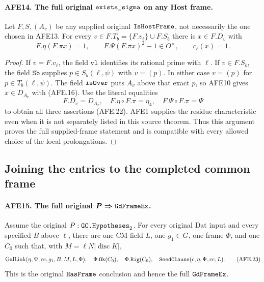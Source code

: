 \documentclass[11pt,a4paper]{article}
\numberwithin{equation}{section}
\theoremstyle{remark}\newtheorem{remark}[theorem]{Remark}
\begin{document}
\paragraph{AFE14. The full original \(\texttt{exists\_\allowbreak sigma}\) on any Host frame.}
\label{claim:AFE14}
Let \(F,S,(A_v)\) be any supplied original
\(\texttt{Is\allowbreak Host\allowbreak Frame}\), not necessarily the one
chosen in AFE13.
For every \(v\in F.T_b=\{F.v_\ell\}\cup F.S_b\)
there is \(x\in F.D_v\) with
\[
          F.\eta(F.\pi x)=1,\qquad
          F.\Psi(F.\pi x)^2-1\in O^\times,\qquad
                              c_\ell(x)=1.              \tag{AFE.22}
\]

\begin{proof}
If \(v=F.v_\ell\), the field \(\texttt{vl}\)
identifies its rational prime with \(\ell\).
If \(v\in F.S_b\), the field \(\texttt{Sb}\)
supplies \(p\in S_b(\ell,\psi)\) with \(v=(p)\).
In either case \(v=(p)\) for \(p\in T_b(\ell,\psi)\).
The field \(\texttt{is\allowbreak Over}\) puts \(A_v\) above
that exact \(p\), so AFE10 gives \(x\in D_{A_v}\)
with (AFE.16).
Use the literal equalities
\[
        F.D_v=D_{A_v},\quad
        F.\eta\circ F.\pi=\eta_4,\quad
        F.\Psi\circ F.\pi=\Psi
 \]
to obtain all three assertions (AFE.22).
AFE1 supplies the residue characteristic even when
it is not separately listed in this source theorem.
Thus this argument proves the full supplied-frame
statement and is compatible with every allowed choice
of the local prolongations.
\end{proof}

\subsection{Joining the entries to the completed common frame}

\paragraph{AFE15. The full original \(\boldsymbol{P\Rightarrow\texttt{Gd\allowbreak Frame\allowbreak Ex}}\).}
\label{claim:AFE15}
Assume the original \(P:\texttt{GC.\allowbreak Hypotheses}_{2}\).
For every original Dat input and every specified
\(B\) above \(\ell\), there are one CM field \(L\),
one \(g_1\in G\), one frame \(\Phi\), and one \(C_0\)
such that, with \(M=\ell N|\operatorname{disc}K|\),
\[
 \operatorname{GalLink}(\eta,\Psi,\mathrm{cc},g_1,B,M,L,\Phi),
 \quad \Phi.\texttt{Ok}(C_0),\quad \Phi.\texttt{Big}(C_0),
 \quad \texttt{Seed\allowbreak Clause}(c,\eta,\Psi,\mathrm{cc},L).
                                                        \tag{AFE.23}
\]
This is the original \(\texttt{Has\allowbreak Frame}\) conclusion
and hence the full \(\texttt{Gd\allowbreak Frame\allowbreak Ex}\).
\end{document}
